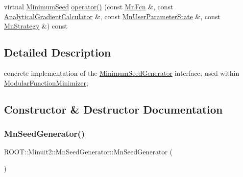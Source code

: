 \begin{DoxyCompactItemize}
\item 
virtual \mbox{\hyperlink{classROOT_1_1Minuit2_1_1MinimumSeed}{Minimum\+Seed}} \mbox{\hyperlink{classROOT_1_1Minuit2_1_1MnSeedGenerator_aeba9e3b985e5d74e797cafaffec74de3}{operator()}} (const \mbox{\hyperlink{classROOT_1_1Minuit2_1_1MnFcn}{Mn\+Fcn}} \&, const \mbox{\hyperlink{classROOT_1_1Minuit2_1_1AnalyticalGradientCalculator}{Analytical\+Gradient\+Calculator}} \&, const \mbox{\hyperlink{classROOT_1_1Minuit2_1_1MnUserParameterState}{Mn\+User\+Parameter\+State}} \&, const \mbox{\hyperlink{classROOT_1_1Minuit2_1_1MnStrategy}{Mn\+Strategy}} \&) const
\end{DoxyCompactItemize}


\subsection{Detailed Description}
concrete implementation of the \mbox{\hyperlink{classROOT_1_1Minuit2_1_1MinimumSeedGenerator}{Minimum\+Seed\+Generator}} interface; used within \mbox{\hyperlink{classROOT_1_1Minuit2_1_1ModularFunctionMinimizer}{Modular\+Function\+Minimizer}}; 

\subsection{Constructor \& Destructor Documentation}
\mbox{\label{classROOT_1_1Minuit2_1_1MnSeedGenerator_ad3ed7b1fc379dd74ba7af16279f77e90}} 
\subsubsection{\texorpdfstring{MnSeedGenerator()}{MnSeedGenerator()}\hspace{0.1cm}{\footnotesize\ttfamily [1/2]}}
{\footnotesize\ttfamily R\+O\+O\+T\+::\+Minuit2\+::\+Mn\+Seed\+Generator\+::\+Mn\+Seed\+Generator (\begin{DoxyParamCaption}{ }\end{DoxyParamCaption})\hspace{0.3cm}{\ttfamily [inline]}}

\mbox{\label{classROOT_1_1Minuit2_1_1MnSeedGenerator_a3dee518720bebaac31b0bdd5b64c9856}} 
